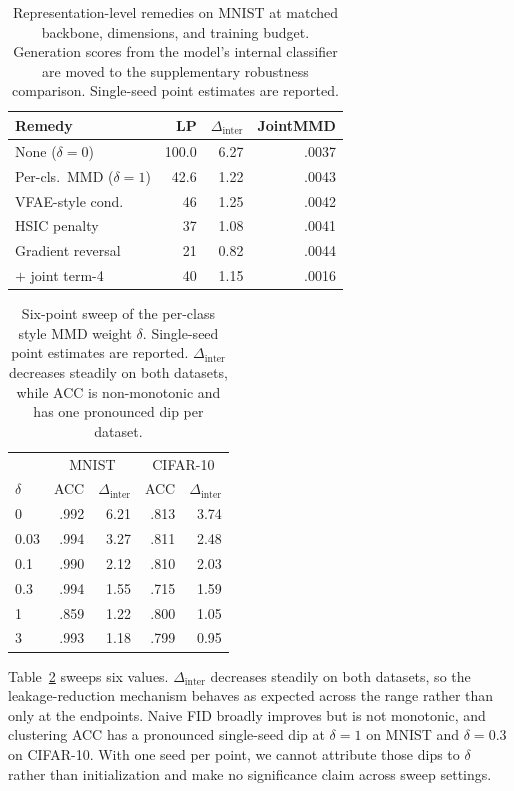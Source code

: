 \documentclass[letterpaper]{article} %
\newcommand{\Dinter}{\Delta_{\mathrm{inter}}}
\begin{document}
\begin{table}[t]
\centering
\small
\setlength{\tabcolsep}{3.5pt}
\caption{Representation-level remedies on MNIST at matched backbone,
dimensions, and training budget. Generation scores from the model's internal
classifier are moved to the supplementary robustness comparison. Single-seed
point estimates are reported.}
\label{tab:invariance}
\scriptsize
\setlength{\tabcolsep}{2.5pt}
\begin{tabular}{lrrr}
\toprule
Remedy & LP & $\Dinter$ & JointMMD \\
\midrule
None ($\delta{=}0$) & 100.0 & 6.27 & .0037 \\
\midrule
Per-cls.\ MMD ($\delta{=}1$) & 42.6 & 1.22 & .0043 \\
{VFAE-style cond.} & 46 & 1.25 & .0042 \\
{HSIC penalty} & 37 & 1.08 & .0041 \\
{Gradient reversal} & 21 & 0.82 & .0044 \\
\midrule
{$+$ joint term-4} & 40 & 1.15 & .0016 \\
\bottomrule
\end{tabular}
\end{table}

\begin{table}[t]
\centering
\small
\setlength{\tabcolsep}{4pt}
\caption{Six-point sweep of the per-class style MMD weight $\delta$.
Single-seed point estimates are reported. $\Dinter$ decreases steadily on
both datasets, while ACC is non-monotonic and has one pronounced dip per
dataset.}
\label{tab:tradeoff}
\scriptsize
\setlength{\tabcolsep}{2.5pt}
\begin{tabular}{lrrrr}
\toprule
& \multicolumn{2}{c}{MNIST} & \multicolumn{2}{c}{CIFAR-10} \\
$\delta$ & ACC & $\Dinter$ & ACC & $\Dinter$ \\
\midrule
0     & .992 & 6.21 & .813 & 3.74 \\
0.03  & .994 & 3.27 & .811 & 2.48 \\
0.1   & .990 & 2.12 & .810 & 2.03 \\
0.3   & .994 & 1.55 & .715 & 1.59 \\
1     & .859 & 1.22 & .800 & 1.05 \\
3     & .993 & 1.18 & .799 & 0.95 \\
\bottomrule
\end{tabular}
\end{table}

Table~\ref{tab:tradeoff} sweeps six values. $\Dinter$ decreases steadily on
both datasets, so the leakage-reduction mechanism behaves as expected across
the range rather than only at the endpoints. Naive FID broadly improves but
is not monotonic, and clustering ACC has a pronounced single-seed dip at
$\delta{=}1$ on MNIST and $\delta{=}0.3$ on CIFAR-10. With one seed per
point, we cannot attribute those dips to $\delta$ rather than initialization
and make no significance claim across sweep settings.
\end{document}
